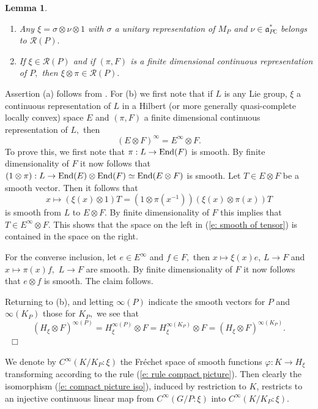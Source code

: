 \documentclass[12pt,a4paper]{article}
\newtheorem{Lemma}[Thm]{Lemma}
\newenvironment{lemma}[0]{\begin{Lemma}\noindent}%
{\end{Lemma}}
\def\proof{\par\noindent{\it Proof.}{\ }{\ }}
\def\qed{~\hfill\hbox{$\Box$}\medbreak}
\def\itema{\vspace{-1mm}\item[{\rm (a)}]}
\def\itemb{\item[{\rm (b)}]}
\def\msy#1{{\mathbb #1}}
\def\C{{\msy C}}
\def\gf{\varphi}
\def\gs{\sigma}
\def\got#1{\mathfrak #1}
\def\fa{{\got a}}
\def\to{\rightarrow}
\def\End{{\rm End}}
\def\iC{{\scriptscriptstyle \C}}
\def\cR{{\mathcal R}}
\numberwithin{Thm}{section}
\numberwithin{equation}{section}
\def\faPdc{{\fa_{P\iC}^*}}
\numberwithin{equation}{section}
\def\faPdc{\fa_{P\iC}^*}
\begin{document}
\begin{lemma}
\begin{enumerate}
\itema
Any $\xi = \gs \otimes \nu \otimes 1$ with $\gs$ a unitary representation of $M_P$ and
$\nu \in \faPdc$ belongs to $\cR(P).$
\itemb
If $\xi \in \cR(P)$ and if $(\pi, F)$ is a finite dimensional continuous representation of 
$P,$ then $\xi \otimes \pi \in \cR(P).$
\end{enumerate} 
\end{lemma}

\proof 
Assertion (a) follows from \cite[p. 3]{Wrrg2}. For (b) we first note that
if $L$ is any Lie group, $\xi$ a continuous representation of $L$ in a Hilbert 
(or more generally quasi-complete locally convex) space
$E$ and $(\pi, F)$ a finite dimensional continuous representation of $L,$ 
then 
\begin{equation}
\label{e: smooth of tensor}
(E \otimes F)^\infty = E^\infty \otimes F. 
\end{equation}
To prove this, we first note that $\pi: L \to \End(F)$ is smooth. By finite dimensionality 
of $F$ it now follows that $(1 \otimes \pi): L \to \End(E)\otimes \End(F) \simeq \End(E \otimes F)$ 
is smooth. Let $T \in E \otimes F$ be a smooth vector.
Then it follows that 
$$ 
x \mapsto (\xi(x) \otimes 1)T =   (1 \otimes \pi(x^{-1}))(\xi(x) \otimes \pi(x)) T
$$%
is smooth from $L$ to $E \otimes F.$ 
By finite dimensionality of $F$ this implies that $T \in E^\infty \otimes F.$ This shows that 
the space on the left in (\ref{e: smooth of tensor}) is contained in the space on the right.

For the converse inclusion, let $e \in E^\infty$ and $f \in F,$ then $x \mapsto \xi(x) e$,  $L \to F$ and 
$x \mapsto \pi(x)f,$ $  L \to F$ are smooth. 
By finite dimensionality of $F$ it now follows that $e \otimes f$ is smooth.
The claim follows.

Returning to (b), and letting $\infty(P)$ indicate the smooth vectors for $P$ 
and $\infty(K_P)$ those for $K_P,$ we see that
$$ 
(H_\xi \otimes F)^{\infty(P)}= H_\xi^{\infty(P)} \otimes F = H_\xi^{\infty(K_P)} \otimes F
=
(H_\xi \otimes F)^{\infty(K_P)}.
$$%
\qed 

We denote by $C^\infty(K/K_P:\xi)$ the Fr\'echet space of smooth functions $\gf: K \to H_\xi$ 
transforming according to the rule (\ref{e: rule compact picture}). 
Then clearly the isomorphism (\ref{e: compact picture iso}), induced by restriction to $K$, 
restricts to an injective continuous linear map from $C^\infty(G/P:\xi)$ into $C^\infty(K/K_P:\xi).$
\end{document}
